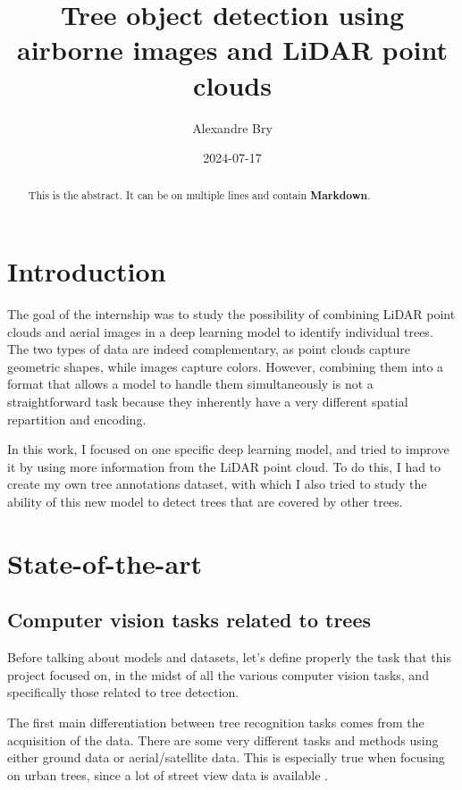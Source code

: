 \documentclass[
]{report}
\title{Tree object detection using airborne images and LiDAR point
clouds}
\author{Alexandre Bry}
\date{2024-07-17}
\renewcommand*\contentsname{Table of contents}
\newcommand\contentsname{Table of contents}
\begin{document}
\maketitle
\begin{abstract}
This is the abstract. It can be on multiple lines and contain
\textbf{Markdown}.
\end{abstract}

\renewcommand*\contentsname{Table of contents}
{
\hypersetup{linkcolor=}
\setcounter{tocdepth}{2}
\tableofcontents
}

\chapter*{Introduction}\label{introduction}

The goal of the internship was to study the possibility of combining
LiDAR point clouds and aerial images in a deep learning model to
identify individual trees. The two types of data are indeed
complementary, as point clouds capture geometric shapes, while images
capture colors. However, combining them into a format that allows a
model to handle them simultaneously is not a straightforward task
because they inherently have a very different spatial repartition and
encoding.

In this work, I focused on one specific deep learning model, and tried
to improve it by using more information from the LiDAR point cloud. To
do this, I had to create my own tree annotations dataset, with which I
also tried to study the ability of this new model to detect trees that
are covered by other trees.

\chapter{State-of-the-art}\label{state-of-the-art}

\section{Computer vision tasks related to
trees}\label{computer-vision-tasks-related-to-trees}

Before talking about models and datasets, let's define properly the task
that this project focused on, in the midst of all the various computer
vision tasks, and specifically those related to tree detection.

The first main differentiation between tree recognition tasks comes from
the acquisition of the data. There are some very different tasks and
methods using either ground data or aerial/satellite data. This is
especially true when focusing on urban trees, since a lot of street view
data is available \autocite{urban-trees}.
\end{document}
